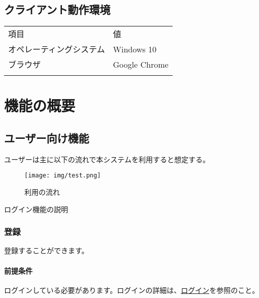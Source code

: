 \documentclass[11pt,a4j]{ltjsarticle}
\let\oldparagraph\paragraph
\renewcommand{\paragraph}[1]{\oldparagraph{#1}\mbox{}}
\begin{document}
\subsection{クライアント動作環境}\label{ux30afux30e9ux30a4ux30a2ux30f3ux30c8ux52d5ux4f5cux74b0ux5883}

\begin{longtable}[c]{@{}ll@{}}
\toprule\addlinespace
項目 & 値
\\\addlinespace
\midrule\endhead
オペレーティングシステム & Windows 10
\\\addlinespace
ブラウザ & Google Chrome
\\\addlinespace
\bottomrule
\end{longtable}

\section{機能の概要}\label{function}

\subsection{ユーザー向け機能}\label{ux30e6ux30fcux30b6ux30fcux5411ux3051ux6a5fux80fd}

ユーザーは主に以下の流れで本システムを利用すると想定する。

\begin{figure}[htbp]
\centering
\texttt{[image: img/test.png]}
\caption{利用の流れ}
\end{figure}


ログイン機能の説明

\subsubsection{登録}\label{function-create}

登録することができます。

\paragraph{前提条件}\label{ux524dux63d0ux6761ux4ef6}

ログインしている必要があります。ログインの詳細は、\hyperref[function-login]{ログイン}を参照のこと。
\end{document}
